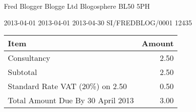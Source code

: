 \documentclass{simple}
\begin{document}
\customertable
    {Fred Blogger}
    {Blogge Ltd}
    {Blogosphere}
    {BL50 5PH}
    {}
    {}
    {}
    {}


\gsdocmeta
    {2013-04-01}
    {2013-04-01}
    {2013-04-30}
    {SI/FREDBLOG/0001}
    {12435}

\gsfixedwidth
\begin{longtable}{|p{460pt}|r|}
\hline
\bf Item & \bf Amount \\
\hline\hline
Consultancy & 2.50 \\
\hline
Subtotal & 2.50\\
Standard Rate VAT (20\%) on 2.50 & 0.50\\
\hline\hline
Total Amount Due By 30 April 2013 & 3.00 \\
\hline
\end{longtable}
\end{document}
